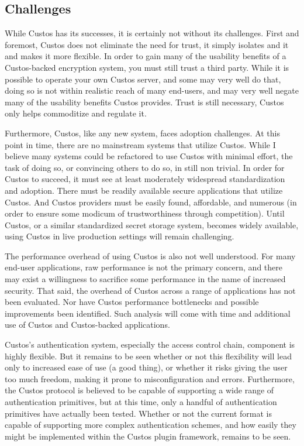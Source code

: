 \subsection{Challenges}

While Custos has its successes, it is certainly not without its
challenges. First and foremost, Custos does not eliminate the need for
trust, it simply isolates and it and makes it more flexible. In order
to gain many of the usability benefits of a Custos-backed encryption
system, you must still trust a third party. While it is possible to
operate your own Custos server, and some may very well do that, doing
so is not within realistic reach of many end-users, and may very well
negate many of the usability benefits Custos provides. Trust is still
necessary, Custos only helps commoditize and regulate it.

Furthermore, Custos, like any new system, faces adoption
challenges. At this point in time, there are no mainstream systems
that utilize Custos. While I believe many systems could be refactored
to use Custos with minimal effort, the task of doing so, or convincing
others to do so, in still non trivial. In order for Custos to succeed,
it must see at least moderately widespread standardization and
adoption. There must be readily available secure applications that
utilize Custos. And Custos providers must be easily found, affordable,
and numerous (in order to ensure some modicum of trustworthiness
through competition). Until Custos, or a similar standardized secret
storage system, becomes widely available, using Custos in live
production settings will remain challenging.

The performance overhead of using Custos is also not well
understood. For many end-user applications, raw performance is not the
primary concern, and there may exist a willingness to sacrifice some
performance in the name of increased security. That said, the overhead
of Custos across a range of applications has not been evaluated. Nor
have Custos performance bottlenecks and possible improvements been
identified. Such analysis will come with time and additional use of
Custos and Custos-backed applications.

Custos's authentication system, especially the access control chain,
component is highly flexible. But it remains to be seen whether or not
this flexibility will lead only to increased ease of use (a good
thing), or whether it risks giving the user too much freedom, making
it prone to misconfiguration and errors. Furthermore, the Custos
protocol is believed to be capable of supporting a wide range of
authentication primitives, but at this time, only a handful of
authentication primitives have actually been tested. Whether or not
the current format is capable of supporting more complex
authentication schemes, and how easily they might be implemented
within the Custos plugin framework, remains to be seen.


